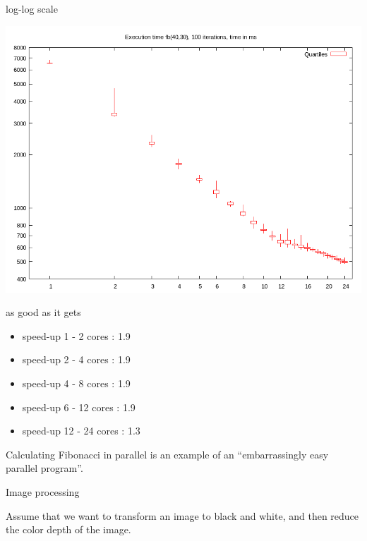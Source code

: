 \begin{frame}{log-log scale}
 
\includegraphics[width=0.6\linewidth]{logxy.png}

\end{frame}

\begin{frame}{as good as it gets}

\begin{itemize}
  \item speed-up 1 - 2 cores : 1.9 %
  \item speed-up 2 - 4 cores : 1.9 %
  \item speed-up 4 - 8 cores : 1.9 %
  \item speed-up 6 - 12 cores : 1.9 %
\pause
  \item speed-up 12 - 24 cores : 1.3 %
\end{itemize}

\pause\vspace{20pt}

Calculating Fibonacci in parallel is an example of an ``embarrassingly
easy parallel program''.

\end{frame}

\begin{frame}{Image processing}

Assume that we want to transform an image to black and white, and then
reduce the color depth of the image.
\end{frame}


